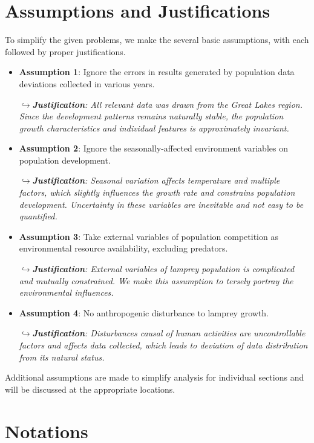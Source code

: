 \documentclass{mcmthesis}
\begin{document}
\section{Assumptions and Justifications}
To simplify the given problems, we make the several basic assumptions, with each followed by proper justifications.
\begin{itemize}
	\setlength{\itemsep}{5pt}
	\item \textbf{Assumption 1}: Ignore the errors in results generated by population data deviations collected in various years.
	
	$\hookrightarrow$\textit{\textbf{Justification}: All relevant data was drawn from the Great Lakes region. Since the development patterns remains naturally stable, the population growth characteristics and individual features is approximately invariant.}
	
	\item \textbf{Assumption 2}: Ignore the seasonally-affected environment variables on population development.
	
	$\hookrightarrow$\textit{\textbf{Justification}: Seasonal variation affects temperature and multiple factors, which slightly influences the growth rate and constrains population development. Uncertainty in these variables are inevitable and not easy to be quantified.}
	
	\item \textbf{Assumption 3}: Take external variables of population competition as environmental resource availability, excluding predators.
	
	$\hookrightarrow$\textit{\textbf{Justification}: External variables of lamprey population is complicated and mutually constrained. We make this assumption to tersely portray the environmental influences. }
	
	\item \textbf{Assumption 4}: No anthropogenic disturbance to lamprey growth.
	
	$\hookrightarrow$\textit{\textbf{Justification}: Disturbances causal of human activities are uncontrollable factors and affects data collected, which leads to deviation of data distribution from its natural status.}
	
\end{itemize}

Additional assumptions are made to simplify analysis for individual sections and will be discussed at the appropriate locations.

\section{Notations}
\end{document}
